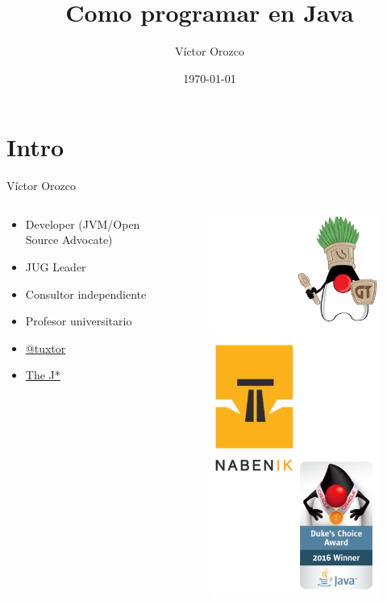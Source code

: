 \documentclass{beamer}
\title{Como programar en Java}
\author{Víctor Orozco}
\institute{Nabenik}
\date{\today}
\begin{document}
\frame{\titlepage}

\section{Intro}

\begin{frame}{Víctor Orozco}
    \begin{columns}[T] %
        \begin{column}[T]{5cm} %
            \begin{itemize}
                \item Developer (JVM/Open Source Advocate)
                \item JUG Leader
                \item Consultor independiente
                \item Profesor universitario
                \item \href{https://twitter.com/tuxtor}{@tuxtor}
                \item \href{http://vorozco.com}{The J*} 
            \end{itemize}
        \end{column}
        \begin{column}[T]{5cm} %
            \begin{figure}
                \centering
                \includegraphics[width=0.6\linewidth]{Images/logos}
            \end{figure}
            

\end{column}
\end{columns}
\end{frame}
\end{document}
